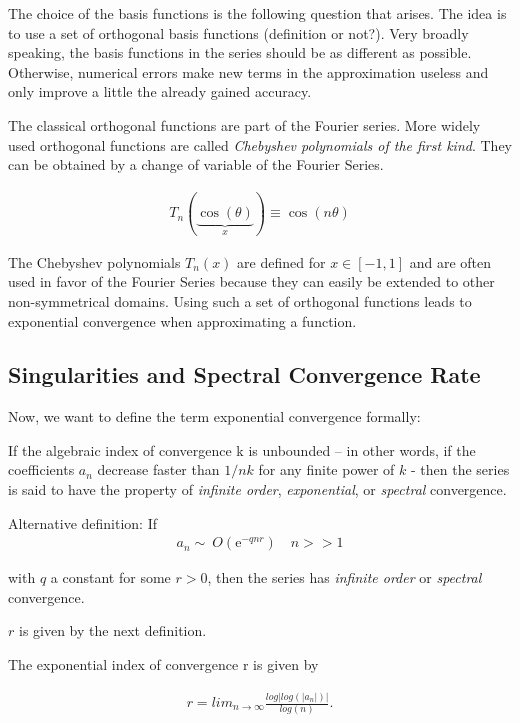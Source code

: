 The choice of the basis functions is the following question that arises. The
idea is to use a set of orthogonal basis functions (definition or not?). Very
broadly speaking, the basis functions in the series should be as different as
possible. Otherwise, numerical errors make new terms in the approximation
useless and only improve a little the already gained accuracy.

The classical orthogonal functions are part of the Fourier series. More widely
used orthogonal functions are called \emph{Chebyshev polynomials of the first
kind}. They can be obtained by a change of variable of the Fourier Series.

\begin{align}
T_n(\underbrace{\cos(\theta)}_{x}) \equiv \cos(n \theta) 
\end{align}

The Chebyshev polynomials $T_n(x)$ are defined for $x \in [-1, 1]$ and are
often used in favor of the Fourier Series because they can easily be extended
to other non-symmetrical domains. Using such a set of orthogonal functions
leads to exponential convergence when approximating a function.

\subsection{Singularities and Spectral Convergence Rate}

Now, we want to define the term exponential convergence formally: 

\begin{definition} \citep{boyd2001}
If the algebraic index of convergence k is unbounded – in other words, if the
coefficients $a_n$ decrease faster than $1/nk$ for any finite power of $k$ -
then the series is said to have the property of \emph{infinite order},
\emph{exponential}, or \emph{spectral} convergence.

Alternative definition: 
If
\begin{align}
a_n  \sim\ O(\mathrm{e}^{-qnr}) \quad n >> 1
\end{align}

with $q$ a constant for some $r > 0$, then the series has \emph{infinite order}
or \emph{spectral} convergence.\
\end{definition}

$r$ is given by the next definition.

\begin{definition} \citep{boyd2001}
The exponential index of convergence r is given by

\begin{align}
r = lim_{n\to\infty} \frac{log | log(| a_n |) |}{log(n)}.
\end{align}
\end{definition}

